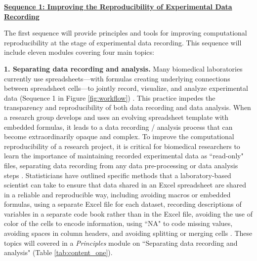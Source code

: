 \documentclass[pdftex,english,11.5pt,parskip=half]{scrartcl}
\begin{document}
\underline{\textbf{Sequence 1: Improving the Reproducibility of Experimental Data
Recording}} 

The first sequence will provide principles and tools for improving
computational reproducibility at the stage of experimental data recording. This sequence will include eleven modules covering four main topics: 

\textbf{1. Separating data recording and analysis.} Many biomedical laboratories currently use spreadsheets---with formulas creating underlying connections between spreadsheet cells---to jointly record, visualize, and analyze experimental data (Sequence 1 in Figure \ref*{fig:workflow}) \cite{broman2018data}. This practice impedes the transparency and reproducibility of both data recording and data analysis. When a research group develops and uses an evolving spreadsheet template with embedded formulas, it leads to a data recording / analysis process that can become extraordinarily opaque and complex. To improve the computational reproducibility of a research project, it is critical for biomedical researchers to learn the importance of maintaining recorded experimental data as ``read-only" files, separating data recording from any data pre-processing or data analysis steps \cite{broman2018data, marwick2018packaging}. Statisticians have outlined specific methods that a laboratory-based scientist can take to ensure that data shared in an Excel spreadsheet are shared in a reliable and reproducible way, including avoiding macros or embedded formulas, using a separate Excel file for each dataset, recording descriptions of variables in a separate code book rather than in the Excel file, avoiding the use of color of the cells to encode information, using ``NA" to code missing values, avoiding spaces in column headers, and avoiding splitting or merging cells \cite{ellis2018share, broman2018data}. These topics will covered in a \textit{Principles} module on ``Separating data
recording and analysis" (Table \ref*{tab:content_one}). 
\end{document}
